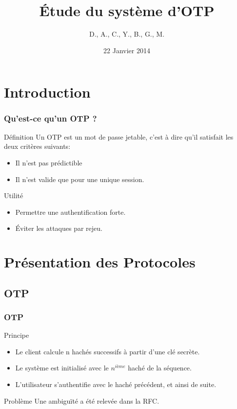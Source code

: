 \documentclass{beamer}
\title{\'Etude du syst\`eme d'OTP}
\author{D.\bsc{Picard}, A.\bsc{Smondack}, C.\bsc{Hardouin}, Y.\bsc{Adegoloye}, B.\bsc{Zigh}, G.\bsc{Ferry}, M.\bsc{Michotte}}
\institute{Université de Rouen}
\date{22 Janvier 2014}
\begin{document}
\begin{frame} 
\titlepage
\end{frame}


\section{Introduction}
\begin{frame}
\frametitle{Qu'est-ce qu'un OTP ?}
\begin{block}{Définition}
    Un OTP est un mot de passe jetable, c'est à dire qu'il satisfait les deux 
  critères suivants:
  \begin{itemize}
    \item Il n'est pas prédictible
    \item Il n'est valide que pour une unique session.
  \end{itemize}
\end{block}

\begin{block}{Utilité}
  \begin{itemize}
    \item Permettre une authentification forte.
    \item Éviter les attaques par rejeu.
  \end{itemize}
\end{block}
\end{frame}

\section{Présentation des Protocoles}
\subsection{OTP}
\begin{frame}
\frametitle{OTP}
\begin{block}{Principe}
\begin{itemize}
 \item Le client calcule n hachés successifs à partir d'une clé secrète.
 \item Le système est initialisé avec le $n^{ième}$ haché de la séquence.
 \item L'utilisateur s'authentifie avec le haché précédent, et ainsi de suite.
\end{itemize}
\end{block}

\begin{block}{Problème}
Une ambiguïté a été relevée dans la RFC.
\end{block}
\end{frame}
\end{document}

